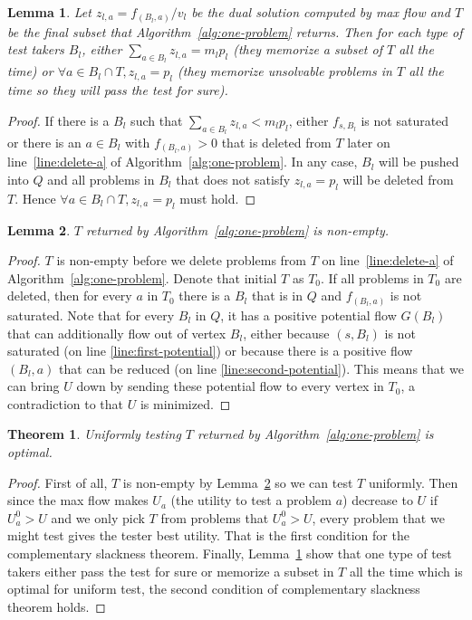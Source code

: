 \documentclass{article}
\newtheorem{theorem}{Theorem}
\newtheorem{lemma}{Lemma}
\begin{document}
\begin{lemma}\label{lemma:best-response}
Let $z_{l,a} = f_{(B_l, a)}/v_l$ be the dual solution computed by max flow and
$T$ be the final subset that Algorithm~\ref{alg:one-problem} returns. Then for
each type of test takers $B_l$, either $\sum_{a \in B_l} z_{l,a} = m_l p_l$
(they memorize a subset of $T$ all the time) or $\forall a \in B_l \cap T,
z_{l, a} = p_l$ (they memorize unsolvable problems in $T$ all the time so they
will pass the test for sure).
\end{lemma}
\begin{proof}
If there is a $B_l$ such that $\sum_{a \in B_l} z_{l,a} < m_l p_l$, either 
$f_{s, B_l}$ is not saturated or there is an $a \in B_l$ with $f_{(B_l, a)} >
0$ that is deleted from $T$ later on line~\ref{line:delete-a} of
Algorithm~\ref{alg:one-problem}. In any case, $B_l$ will be pushed into $Q$ and
all problems in $B_l$ that does not satisfy $z_{l,a} = p_l$ will be deleted
from $T$. Hence $\forall a \in B_l \cap T, z_{l, a} = p_l$ must hold.
\end{proof}

\begin{lemma}\label{lemma:non-empty}
$T$ returned by Algorithm~\ref{alg:one-problem} is non-empty.
\end{lemma}
\begin{proof}
$T$ is non-empty before we delete problems from $T$ on
line~\ref{line:delete-a} of Algorithm~\ref{alg:one-problem}.  Denote that
initial $T$ as $T_0$.  If all problems in $T_0$ are deleted, then for every $a$
in $T_0$ there is a $B_l$ that is in $Q$ and $f_{(B_l, a)}$ is not saturated.
Note that for every $B_l$ in $Q$, it has a positive potential flow $G(B_l)$
that can additionally flow out of vertex $B_l$, either because $(s, B_l)$ is
not saturated (on line \ref{line:first-potential}) or because there is a
positive flow $(B_l, a)$ that can be reduced (on line
\ref{line:second-potential}). This means that we can bring $U$ down by sending
these potential flow to every vertex in $T_0$, a contradiction to that
$U$ is minimized.
\end{proof}

\begin{theorem}
Uniformly testing $T$ returned by Algorithm~\ref{alg:one-problem} is optimal.
\end{theorem}
\begin{proof}
First of all, $T$ is non-empty by Lemma~\ref{lemma:non-empty} so we can test
$T$ uniformly. Then since the max flow makes $U_a$ (the utility to test a
problem $a$) decrease to $U$ if $U^0_a > U$ and we only pick $T$ from problems
that $U^0_a > U$, every problem that we might test gives the tester best
utility. That is the first condition for the complementary slackness theorem.
Finally, Lemma~\ref{lemma:best-response} show that one type of test takers
either pass the test for sure or memorize a subset in $T$ all the time which is
optimal for uniform test, the second condition of complementary slackness
theorem holds.
\end{proof}
\end{document}
